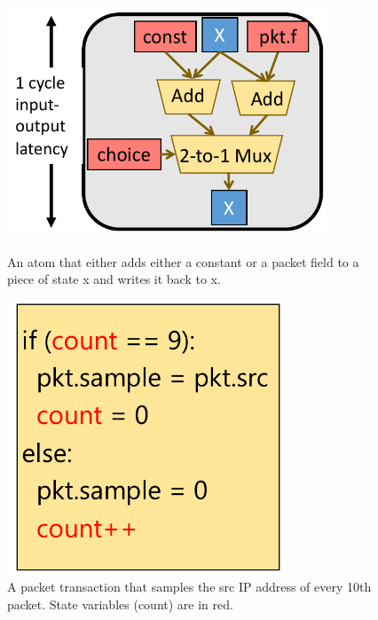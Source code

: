 \begin{figure}[!t]
\begin{minipage}{0.48\textwidth}
\centering
\vspace{0.38in}
\includegraphics[width=0.85\textwidth]{atom.pdf}
\caption{An atom that either adds either a constant or a packet field to a
piece of state x and writes it back to x.}
\label{fig:simple_atom}
\end{minipage}
\hfill
\begin{minipage}{0.48\textwidth}
\centering
\includegraphics[width=0.75\textwidth]{packet_transaction.pdf}
\caption{A packet transaction that samples the src IP address of every 10th
packet. State variables (count) are in red.}
\label{fig:simple_transaction}
\end{minipage}
\end{figure}

